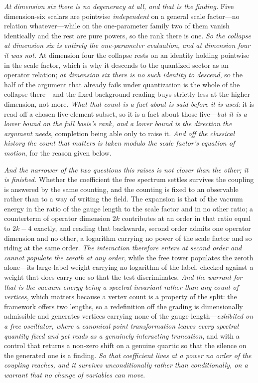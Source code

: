 \documentclass[11pt,a4paper]{article}
\theoremstyle{plain}
\theoremstyle{definition}
\theoremstyle{remark}
\begin{document}
\emph{At dimension six there is no degeneracy at all, and that is the finding.} Five dimension-six
scalars are pointwise \emph{independent} on a general scale factor---no relation whatever---while on the
one-parameter family two of them vanish identically and the rest are pure powers, so the rank there is
one. \emph{So the collapse at dimension six is entirely the one-parameter evaluation, and at dimension
four it was not.} At dimension four the collapse rests on an identity holding pointwise in the scale
factor, which is why it descends to the quantized sector as an operator relation; \emph{at dimension six
there is no such identity to descend}, so the half of the argument that already fails under quantization
is the whole of the collapse there---and the fixed-background reading buys strictly less at the higher
dimension, not more. \emph{What that count is a fact about is said before it is used}: it is read off a
chosen five-element subset, so it is a fact about those five---\emph{but it is a lower bound on the full
basis's rank, and a lower bound is the direction the argument needs}, completion being able only to
raise it. \emph{And off the classical history the count that matters is taken modulo the scale factor's
equation of motion}, for the reason given below.

\emph{And the narrower of the two questions this raises is not closer than the other; it is finished.}
Whether the coefficient the free spectrum settles survives the coupling is answered by the same
counting, and the counting is fixed to an observable rather than to a way of writing the field. The
expansion is that of the vacuum energy in the ratio of the gauge length to the scale factor and in no
other ratio; a counterterm of operator dimension $2k$ contributes at an order in that ratio equal to
$2k-4$ exactly, and reading that backwards, second order admits one operator dimension and no other,
a logarithm carrying no power of the scale factor and so riding at the same order. \emph{The interaction
therefore enters at second order and cannot populate the zeroth at any order}, while the free tower
populates the zeroth alone---its large-label weight carrying no logarithm of the label, checked against a
weight that does carry one so that the test discriminates. \emph{And the warrant for that is the vacuum
energy being a spectral invariant rather than any count of vertices}, which matters because a vertex count
is a property of the split: the framework offers two lengths, so a redefinition off the grading is
dimensionally admissible and generates vertices carrying none of the gauge length---\emph{exhibited on a
free oscillator, where a canonical point transformation leaves every spectral quantity fixed and yet
reads as a genuinely interacting truncation}, and with a control that returns a non-zero shift on a
genuine quartic so that the silence on the generated one is a finding. \emph{So that coefficient lives at
a power no order of the coupling reaches, and it survives unconditionally rather than conditionally, on a
warrant that no change of variables can move}.
\end{document}
